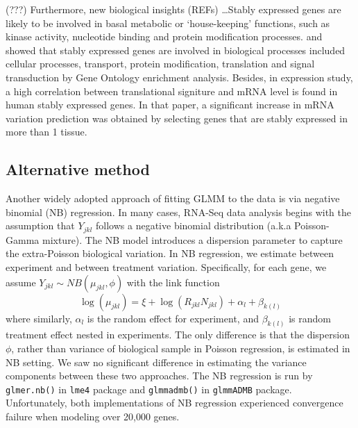 \documentclass[11pt, a4paper]{article}
\begin{document}


(???) Furthermore, new biological insights (REFs) \dots Stably expressed genes
are likely to be involved in basal metabolic or ‘house-keeping’ functions, such
as  kinase activity, nucleotide binding and protein modification processes.
\cite{sekhon2011genome} and \cite{wang2010dynamic} showed that stably
expressed genes are involved in biological processes included cellular
processes, transport, protein modification, translation and signal
transduction by Gene Ontology enrichment analysis. Besides, in expression
study, a high correlation between translational signiture and mRNA level is
found in human stably expressed genes\citep{line2013translational}. In that
paper, a significant increase in mRNA variation prediction was obtained by
selecting genes that are stably expressed in more than 1 tissue.\\




  \subsection{Alternative method}
Another widely adopted approach of fitting GLMM to the data is via negative binomial (NB) regression. In many cases,  RNA-Seq data analysis begins with the assumption that $Y_{jkl}$ follows a negative binomial distribution (a.k.a Poisson-Gamma mixture). The NB model introduces a dispersion parameter to capture the extra-Poisson biological variation.  In NB regression, we estimate between experiment and between treatment variation. Specifically,  for each gene, we assume $Y_{jkl}\sim NB(\mu_{jkl}, \phi)$ with the link function
 \[\log(\mu_{jkl})= \xi + \log(R_{jkl}N_{jkl}) + \alpha_l + \beta_{k(l)}\]
where similarly, $\alpha_l$ is the random effect for experiment, and $\beta_{k(l)}$ is random treatment effect nested in experiments.  The only difference is that the dispersion $\phi$, rather than variance of biological sample in Poisson regression, is estimated in NB setting. We saw no significant difference in estimating the variance components between these two approaches. The NB regression is run by \verb"glmer.nb()" in \verb"lme4" package\citep{bates2012lme4} and \verb"glmmadmb()" in \verb"glmmADMB" package\citep{bolker2012getting}. Unfortunately, both implementations of NB regression experienced convergence failure when modeling over 20,000 genes. \\
\end{document}
